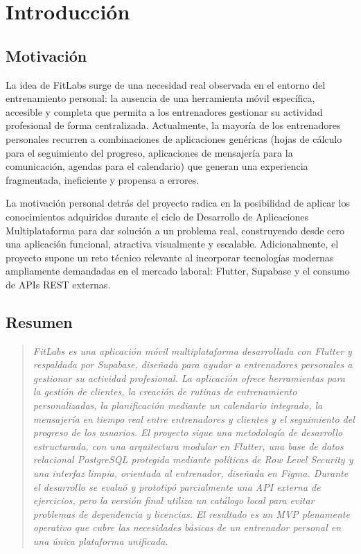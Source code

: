 \chapter{Introducción}

\section{Motivación}

La idea de FitLabs surge de una necesidad real observada en el entorno del entrenamiento personal: la ausencia de una herramienta móvil específica, accesible y completa que permita a los entrenadores gestionar su actividad profesional de forma centralizada. Actualmente, la mayoría de los entrenadores personales recurren a combinaciones de aplicaciones genéricas (hojas de cálculo para el seguimiento del progreso, aplicaciones de mensajería para la comunicación, agendas para el calendario) que generan una experiencia fragmentada, ineficiente y propensa a errores.

La motivación personal detrás del proyecto radica en la posibilidad de aplicar los conocimientos adquiridos durante el ciclo de Desarrollo de Aplicaciones Multiplataforma para dar solución a un problema real, construyendo desde cero una aplicación funcional, atractiva visualmente y escalable. Adicionalmente, el proyecto supone un reto técnico relevante al incorporar tecnologías modernas ampliamente demandadas en el mercado laboral: Flutter, Supabase y el consumo de APIs REST externas.

\section{Resumen}

\begin{quote}
\textit{FitLabs es una aplicación móvil multiplataforma desarrollada con Flutter y respaldada por Supabase, diseñada para ayudar a entrenadores personales a gestionar su actividad profesional. La aplicación ofrece herramientas para la gestión de clientes, la creación de rutinas de entrenamiento personalizadas, la planificación mediante un calendario integrado, la mensajería en tiempo real entre entrenadores y clientes y el seguimiento del progreso de los usuarios. El proyecto sigue una metodología de desarrollo estructurada, con una arquitectura modular en Flutter, una base de datos relacional PostgreSQL protegida mediante políticas de Row Level Security y una interfaz limpia, orientada al entrenador, diseñada en Figma. Durante el desarrollo se evaluó y prototipó parcialmente una API externa de ejercicios, pero la versión final utiliza un catálogo local para evitar problemas de dependencia y licencias. El resultado es un MVP plenamente operativo que cubre las necesidades básicas de un entrenador personal en una única plataforma unificada.}
\end{quote}

